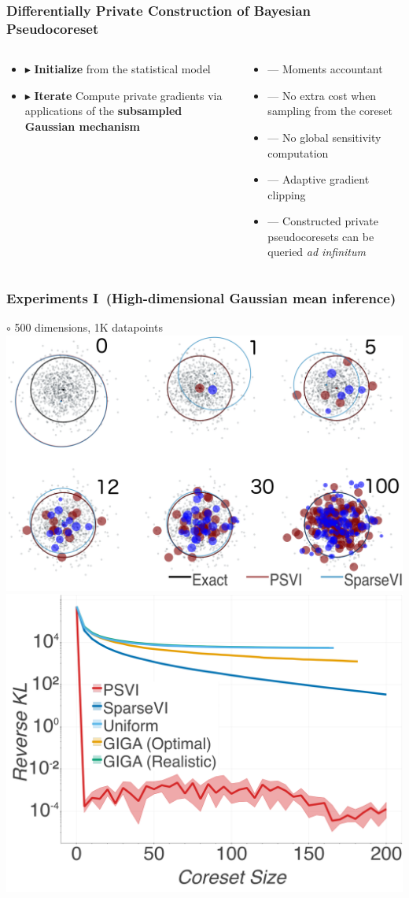 \documentclass[hyperref={colorlinks = true},unknownkeysallowed]{beamer}
\let\oldcitep=\citep
\renewcommand\citep[1]{\hypersetup{linkcolor=darkred}\hyperlink{#1}{\oldcitep{#1}}}
\begin{document}
\begin{frame}
	\frametitle{Differentially Private Construction of Bayesian Pseudocoreset}
	\vspace{-4pt}
	\begin{columns}
		\begin{column}[t]{0.4\textwidth}
		\begin{itemize}
			\item $\blacktriangleright$ \textbf{Initialize}  from the statistical model
			\item $\blacktriangleright$ \textbf{Iterate} Compute private gradients via applications of the \textbf{subsampled Gaussian mechanism}~\citep{abadi16}
		\end{itemize}
		\end{column}
	\pause
		\begin{column}[t]{0.6\textwidth}
		\begin{itemize}
			\item --- {Moments accountant}
			\item --- {No extra  cost when sampling from the coreset}
			\item --- {No global sensitivity computation}
			\item --- {Adaptive gradient clipping} 
			\item --- {Constructed private pseudocoresets can be queried \emph{ad infinitum}} 
		\end{itemize}
		\end{column}
	\end{columns}
\end{frame}

\begin{frame}
	\frametitle{Experiments I~(High-dimensional Gaussian mean inference)}
	\centering 
	$\circ$ 500 dimensions, 1K datapoints\\
	\includegraphics[width=.49\textwidth]{figs/d500_pts_combined.png}
	\includegraphics[width=.49\textwidth]{figs/d500_KLDvsCstSize.png}
\end{frame}
\end{document}
